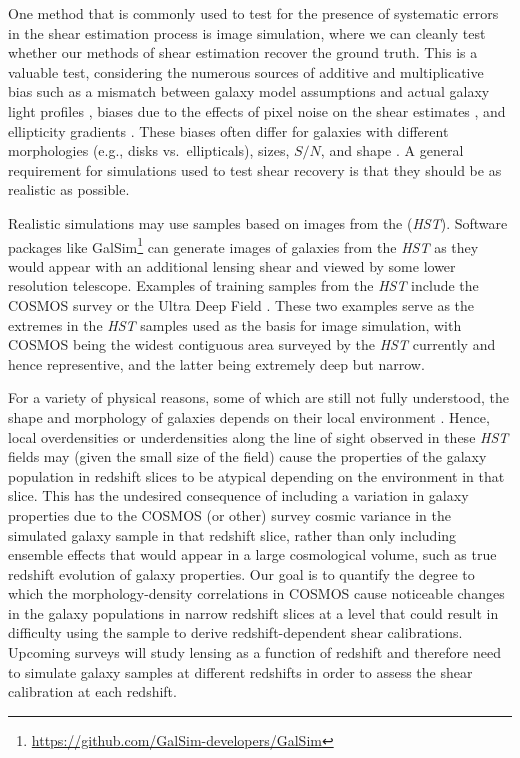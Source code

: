 \documentclass[twocolumn,useAMS,usenatbib]{mn2e}
\begin{document}
One method that is commonly used to test for the presence of
systematic errors in the shear estimation process is image simulation,
where we can cleanly test whether our methods of shear estimation
recover the ground truth. This is a valuable test, considering the
numerous sources of additive and multiplicative bias such as a
mismatch between galaxy model assumptions and actual galaxy light
profiles \citep[e.g.,][]{2010MNRAS.404..458V, 2010A&A...510A..75M}, biases due to the effects of pixel noise on the
shear estimates
\citep{2012MNRAS.427.2711K,2012MNRAS.424.2757M,2012MNRAS.425.1951R},
and ellipticity gradients \citep{2010MNRAS.406.2793B}.  These biases
often differ for galaxies with different morphologies (e.g., disks
vs.\ ellipticals), sizes, $S/N$, and shape \citep{2010MNRAS.405.2044B,2012MNRAS.423.3163K}. 
A general requirement for simulations used to test shear recovery is
that they should be as realistic as possible.
 
 Realistic simulations may use samples based on images from the 
 ({\em HST}). Software packages like
{\sc GalSim}\footnote{\url{https://github.com/GalSim-developers/GalSim}}
\citep{2014arXiv1407.7676R} can generate images of galaxies from the
{\em HST} as they would appear with an additional lensing shear and
viewed by some lower resolution telescope.  Examples of training samples from the {\em HST} include 
the COSMOS survey \citep[used by the GREAT3 challenge,][]{great3} or the
 Ultra Deep Field \citep[UDF, used by][]{2013ApJ...765...74J}.  These
 two examples serve as the extremes in the {\em HST} samples used as
 the basis for image simulation, with COSMOS being 
the widest contiguous area surveyed by the {\em HST} currently and hence representive, and the 
latter being extremely deep but narrow.

For a variety of physical reasons, some of which are still not fully
understood, the shape and morphology of
galaxies depends on their local environment
\citep[e.g.,][]{2014arXiv1402.1172C,2014MNRAS.444.2200D}. 
Hence, local overdensities or underdensities along the line of sight
observed in these {\em HST} fields may (given the small size of the field)
cause the properties of the galaxy population in redshift slices to be
atypical depending on the environment in that slice.  This has
the undesired consequence of including a variation in galaxy properties
due to the COSMOS (or other) survey cosmic variance in the simulated galaxy sample in that redshift slice, rather than
only including ensemble effects that would appear in a large cosmological volume, such as true redshift evolution of
galaxy properties.  Our goal is to quantify the degree to which the
morphology-density correlations in COSMOS cause noticeable changes in
the galaxy populations in narrow redshift slices at a level that could
result in difficulty using the sample to derive redshift-dependent
shear calibrations.   Upcoming surveys will study lensing as a function of
redshift and therefore need to simulate galaxy samples at different
redshifts in order to assess the shear calibration at each redshift.
\end{document}
